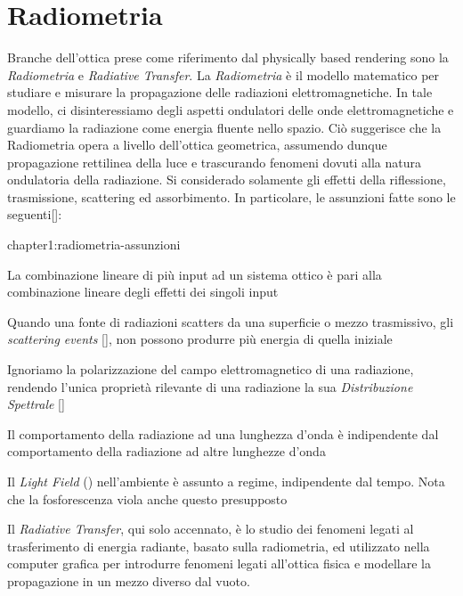 \section{Radiometria}
\label{radiometria}
Branche dell'ottica prese come riferimento dal physically based rendering sono la \textit{Radiometria} e \textit{Radiative Transfer}.
La \textit{Radiometria} \`e il modello matematico per studiare e misurare la propagazione delle radiazioni elettromagnetiche. In tale modello, ci 
disinteressiamo degli aspetti ondulatori delle onde elettromagnetiche e guardiamo la radiazione come energia fluente nello spazio. Ci\`o suggerisce
che la Radiometria opera a livello dell'ottica geometrica, assumendo dunque propagazione rettilinea della luce e trascurando fenomeni dovuti alla 
natura ondulatoria della radiazione. Si considerado solamente gli effetti della riflessione, trasmissione, scattering ed assorbimento.
In particolare, le assunzioni fatte sono le seguenti[\cite{pharr}]:
\begin{altDescription}{chapter1:radiometria-assunzioni}
	\item[Linearit\`a] La combinazione lineare di pi\`u input ad un sistema ottico \`e pari alla combinazione lineare degli effetti dei singoli input
	\item[Conservazione dell'energia] Quando una fonte di radiazioni scatters da una superficie o mezzo trasmissivo, gli \textit{scattering events}
		[\cite{pegoraro}], non possono produrre pi\`u energia di quella iniziale
	\item[No polarizzazione] Ignoriamo la polarizzazione del campo elettromagnetico di una radiazione, rendendo l'unica propriet\`a rilevante di
		una radiazione la sua \textit{Distribuzione Spettrale} []
	\item[No fluorescenza o fosforescenza] Il comportamento della radiazione ad una lunghezza d'onda \`e indipendente dal comportamento della 
		radiazione ad altre lunghezze d'onda
	\item[A regime] Il \textit{Light Field} () nell'ambiente \`e assunto a regime, indipendente dal tempo. Nota che la 
		fosforescenza viola anche questo presupposto
\end{altDescription}
Il \textit{Radiative Transfer}, qui solo accennato, \`e lo studio dei fenomeni legati al trasferimento di energia radiante, basato sulla radiometria,
ed utilizzato nella computer grafica per introdurre fenomeni legati all'ottica fisica e modellare la propagazione in un mezzo diverso dal vuoto.\par
